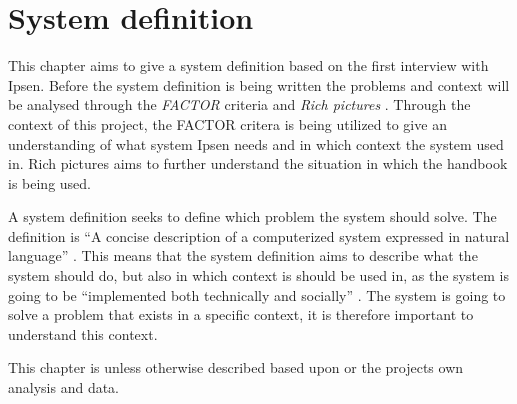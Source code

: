\chapter{System definition}\label{ch:SystemDefinition}
This chapter aims to give a system definition based on the first interview with Ipsen.
Before the system definition is being written the problems and context will be analysed through the \textit{FACTOR} criteria and \textit{Rich pictures} \citep{Rod-Aalborg}.
Through the context of this project, the FACTOR critera is being utilized to give an understanding of what system Ipsen needs and in which context the system used in.
Rich pictures aims to further understand the situation in which the handbook is being used.

A system definition seeks to define which problem the system should solve. 
The definition is “A concise description of a computerized system expressed in natural language” \citep[p.~24]{Rod-Aalborg}. 
This means that the system definition aims to describe what the system should do, but also in which context is should be used in, as the system is going to be “implemented both technically and socially” \citep[p.~23]{Rod-Aalborg}. 
The system is going to solve a problem that exists in a specific context, it is therefore important to understand this context.

This chapter is unless otherwise described based upon \cite{Rod-Aalborg} or the projects own analysis and data.

